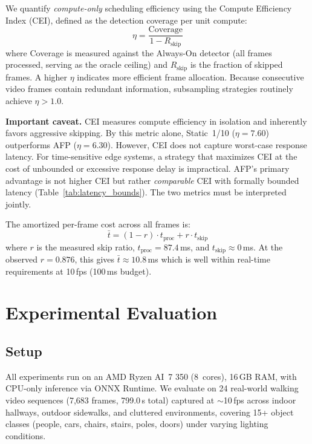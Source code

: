 \documentclass[conference]{IEEEtran}
\begin{document}
We quantify \emph{compute-only} scheduling efficiency using the
Compute Efficiency Index (CEI), defined as the detection coverage
per unit compute:
\begin{equation}
  \eta = \frac{\text{Coverage}}{1 - R_\text{skip}}
  \label{eq:cei}
\end{equation}
where Coverage is measured against the Always-On detector (all
frames processed, serving as the oracle ceiling) and $R_\text{skip}$
is the fraction of skipped frames. A higher $\eta$ indicates more
efficient frame allocation. Because consecutive video frames
contain redundant information, subsampling strategies routinely
achieve $\eta > 1.0$.

\textbf{Important caveat.} CEI measures compute efficiency in
isolation and inherently favors aggressive skipping. By this metric
alone, Static~1/10 ($\eta = 7.60$) outperforms AFP ($\eta = 6.30$).
However, CEI does not capture worst-case response latency. For
time-sensitive edge systems, a strategy that
maximizes CEI at the cost of unbounded or excessive response delay
is impractical. AFP's primary advantage is not higher CEI but
rather \emph{comparable} CEI with formally bounded latency
(Table~\ref{tab:latency_bounds}). The two metrics must be
interpreted jointly.

The amortized per-frame cost across all frames is:
\begin{equation}
  \bar{t} = (1 - r) \cdot t_\text{proc} + r \cdot t_\text{skip}
  \label{eq:amortized}
\end{equation}
where $r$ is the measured skip ratio, $t_\text{proc} = 87.4$\,ms,
and $t_\text{skip} \approx 0$\,ms. At the observed
$r = 0.876$, this gives $\bar{t} \approx 10.8$\,ms which is well within
real-time requirements at 10\,fps (100\,ms budget).

\section{Experimental Evaluation}
\label{sec:experiments}

\subsection{Setup}

All experiments run on an AMD Ryzen AI~7 350 (8~cores), 16\,GB RAM,
with CPU-only inference via ONNX Runtime. We evaluate on 24
real-world walking video sequences (7,683 frames, 799.0\,s total)
captured at $\sim$10\,fps across indoor hallways, outdoor sidewalks,
and cluttered environments, covering 15+ object classes (people,
cars, chairs, stairs, poles, doors) under varying lighting
conditions.
\end{document}

